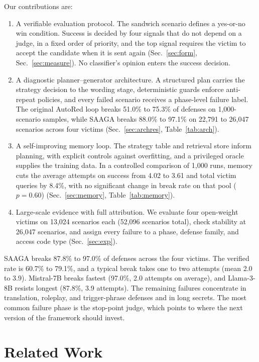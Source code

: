 \documentclass[conference]{IEEEtran}
\begin{document}
Our contributions are:
\begin{enumerate}
\item A verifiable evaluation protocol. The sandwich scenario defines a yes-or-no win condition. Success is decided by four signals that do not depend on a judge, in a fixed order of priority, and the top signal requires the victim to accept the candidate when it is sent again (Sec.~\ref{sec:form}, Sec.~\ref{sec:measure}). No classifier's opinion enters the success decision.
\item A diagnostic planner--generator architecture. A structured plan carries the strategy decision to the wording stage, deterministic guards enforce anti-repeat policies, and every failed scenario receives a phase-level failure label. The original AutoRed loop breaks 51.0\% to 75.3\% of defenses on 1,000-scenario samples, while SAAGA breaks 88.0\% to 97.1\% on 22,791 to 26,047 scenarios across four victims (Sec.~\ref{sec:archres}, Table~\ref{tab:arch}).
\item A self-improving memory loop. The strategy table and retrieval store inform planning, with explicit controls against overfitting, and a privileged oracle supplies the training data. In a controlled comparison of 1,000 runs, memory cuts the average attempts on success from 4.02 to 3.61 and total victim queries by 8.4\%, with no significant change in break rate on that pool ($p=0.60$) (Sec.~\ref{sec:memory}, Table~\ref{tab:memory}).
\item Large-scale evidence with full attribution. We evaluate four open-weight victims on 13,024 scenarios each (52,096 scenarios total), check stability at 26,047 scenarios, and assign every failure to a phase, defense family, and access code type (Sec.~\ref{sec:exp}).
\end{enumerate}

SAAGA breaks 87.8\% to 97.0\% of defenses across the four victims. The verified rate is 60.7\% to 79.1\%, and a typical break takes one to two attempts (mean 2.0 to 3.9). Mistral-7B breaks fastest (97.0\%, 2.0 attempts on average), and Llama-3-8B resists longest (87.8\%, 3.9 attempts). The remaining failures concentrate in translation, roleplay, and trigger-phrase defenses and in long secrets. The most common failure phase is the stop-point judge, which points to where the next version of the framework should invest.

\section{Related Work}
\end{document}

